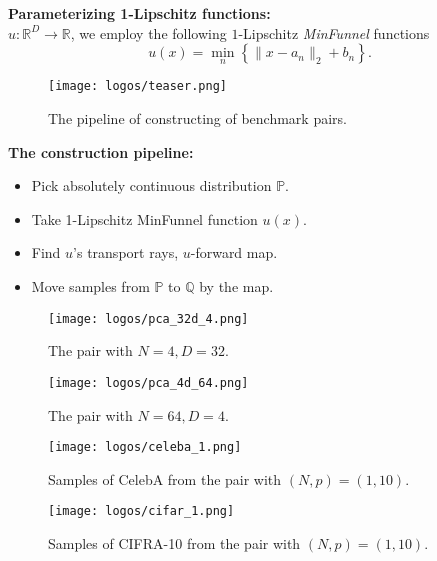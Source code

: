 \documentclass[final]{beamer}
\newlength{\colwidth}
\begin{document}
\begin{frame}[t]
\begin{columns}[t]
\begin{column}{\colwidth}
\begin{block}{ \noindent{}}
  
\vspace{-4 mm}\centering\textbf{Parameterizing 1-Lipschitz functions:}\\[0.5 cm]
$u:\mathbb{R}^{D}\rightarrow\mathbb{R}$, we employ the following $1$-Lipschitz \textit{MinFunnel} functions
$$u(x) =\min_{n} \left\lbrace \|x-a_{n}\|_{2}+b_{n}\right\rbrace.$$
\begin{figure}
      \centering
      \vspace{-9 mm}
      \texttt{[image: logos/teaser.png]}
      \caption{The pipeline of constructing of benchmark pairs.}
      \label{fig:teaser}
      \vspace{-4 mm}
  \end{figure}   
\centering\textbf{The construction pipeline:}
\centering
\begin{itemize}
    \item{Pick absolutely continuous distribution $\mathbb{P}$.}
    \item{Take 1-Lipschitz MinFunnel function $u(x)$.}
    \item{Find $u$'s transport rays, $u$-forward map.}
    \item{Move samples from $\mathbb{P}$ to   $\mathbb{Q}$ by the  map.}
\end{itemize}

 
 
 

 
 
 \end{block}
\begin{block}{\noindent{}}

\begin{figure}[!htb]
  \texttt{[image: logos/pca\_32d\_4.png]}
  \caption{\centering The pair with $N=4, D=32$.}
\endminipage\hfill
{}
  \texttt{[image: logos/pca\_4d\_64.png]}
  \caption{\centering The pair with $N=64, D=4$.}
\endminipage


\end{figure}

\begin{figure}[!htb]
  \texttt{[image: logos/celeba\_1.png]}
  \caption{\centering Samples of CelebA from the pair with $(N,p)=(1,10)$.}
\endminipage\hfill
{}
  \texttt{[image: logos/cifar\_1.png]}
  \caption{\centering Samples of CIFRA-10 from the pair with $(N,p)=(1,10)$.}
\endminipage



\end{figure}
\end{block}
\end{column}
\end{columns}
\end{frame}
\end{document}
